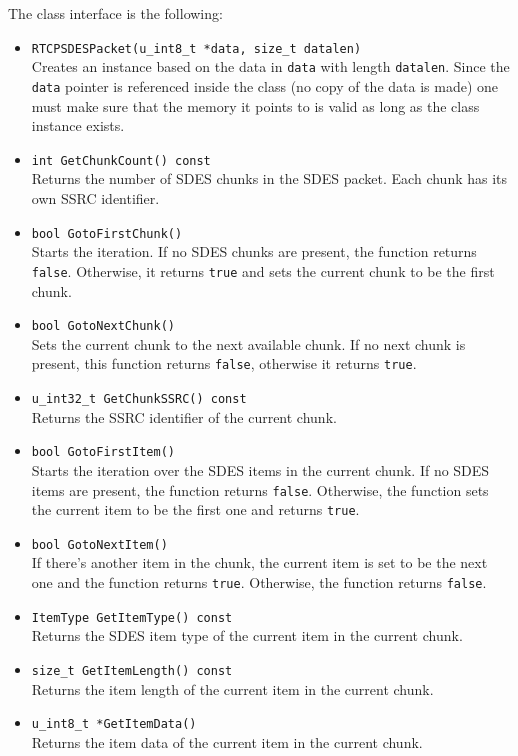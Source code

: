 \documentclass[12pt,a4paper]{article}
\begin{document}
					The class interface is the following:
					\begin{itemize}
						\item {\tt RTCPSDESPacket(u\_int8\_t *data, size\_t datalen)}\\
							Creates an instance based on the data in {\tt data} with
							length {\tt datalen}. Since the {\tt data} pointer
							is referenced inside the class (no copy of the data is
							made) one must make sure that the memory it points to is
							valid as long as the class instance exists.
						\item {\tt int GetChunkCount() const}\\
							Returns the number of SDES chunks in the SDES packet.
							Each chunk has its own SSRC identifier.
						\item {\tt bool GotoFirstChunk()}\\
							Starts the iteration. If no SDES chunks are present,
							the function returns {\tt false}. Otherwise, it
							returns {\tt true} and sets the current chunk to be
							the first chunk.
						\item {\tt bool GotoNextChunk()}\\
							Sets the current chunk to the next available chunk.
							If no next chunk is present, this function returns
							{\tt false}, otherwise it returns {\tt true}.
						\item {\tt u\_int32\_t GetChunkSSRC() const}\\
							Returns the SSRC identifier of the current chunk.
						\item {\tt bool GotoFirstItem()}\\
							Starts the iteration over the SDES items in the current
							chunk. If no SDES items are present, the function returns
							{\tt false}. Otherwise, the function sets the current item
							to be the first one and returns {\tt true}.
						\item {\tt bool GotoNextItem()}\\
							If there's another item in the chunk, the current item
							is set to be the next one and the function returns {\tt true}.
							Otherwise, the function returns {\tt false}.
						\item {\tt ItemType GetItemType() const}\\
							Returns the SDES item type of the current item in the current
							chunk.
						\item {\tt size\_t GetItemLength() const}\\
							Returns the item length of the current item in the current
							chunk.
						\item {\tt u\_int8\_t *GetItemData()}\\
							Returns the item data of the current item in the current
							chunk.
					\end{itemize}
\end{document}
